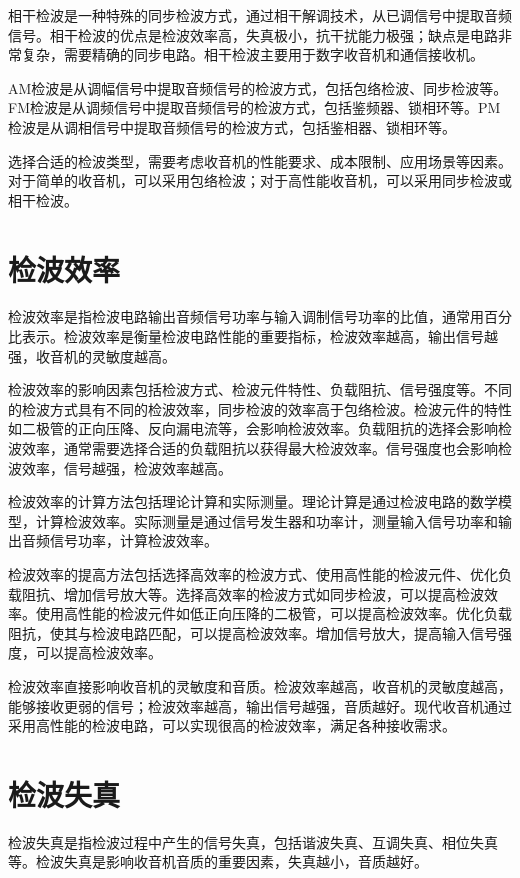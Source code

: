\documentclass[12pt,UTF8]{ctexbook}
\begin{document}
相干检波是一种特殊的同步检波方式，通过相干解调技术，从已调信号中提取音频信号。相干检波的优点是检波效率高，失真极小，抗干扰能力极强；缺点是电路非常复杂，需要精确的同步电路。相干检波主要用于数字收音机和通信接收机。

AM检波是从调幅信号中提取音频信号的检波方式，包括包络检波、同步检波等。FM检波是从调频信号中提取音频信号的检波方式，包括鉴频器、锁相环等。PM检波是从调相信号中提取音频信号的检波方式，包括鉴相器、锁相环等。

选择合适的检波类型，需要考虑收音机的性能要求、成本限制、应用场景等因素。对于简单的收音机，可以采用包络检波；对于高性能收音机，可以采用同步检波或相干检波。

\section{检波效率}

检波效率是指检波电路输出音频信号功率与输入调制信号功率的比值，通常用百分比表示。检波效率是衡量检波电路性能的重要指标，检波效率越高，输出信号越强，收音机的灵敏度越高。

检波效率的影响因素包括检波方式、检波元件特性、负载阻抗、信号强度等。不同的检波方式具有不同的检波效率，同步检波的效率高于包络检波。检波元件的特性如二极管的正向压降、反向漏电流等，会影响检波效率。负载阻抗的选择会影响检波效率，通常需要选择合适的负载阻抗以获得最大检波效率。信号强度也会影响检波效率，信号越强，检波效率越高。

检波效率的计算方法包括理论计算和实际测量。理论计算是通过检波电路的数学模型，计算检波效率。实际测量是通过信号发生器和功率计，测量输入信号功率和输出音频信号功率，计算检波效率。

检波效率的提高方法包括选择高效率的检波方式、使用高性能的检波元件、优化负载阻抗、增加信号放大等。选择高效率的检波方式如同步检波，可以提高检波效率。使用高性能的检波元件如低正向压降的二极管，可以提高检波效率。优化负载阻抗，使其与检波电路匹配，可以提高检波效率。增加信号放大，提高输入信号强度，可以提高检波效率。

检波效率直接影响收音机的灵敏度和音质。检波效率越高，收音机的灵敏度越高，能够接收更弱的信号；检波效率越高，输出信号越强，音质越好。现代收音机通过采用高性能的检波电路，可以实现很高的检波效率，满足各种接收需求。

\section{检波失真}

检波失真是指检波过程中产生的信号失真，包括谐波失真、互调失真、相位失真等。检波失真是影响收音机音质的重要因素，失真越小，音质越好。
\end{document}
